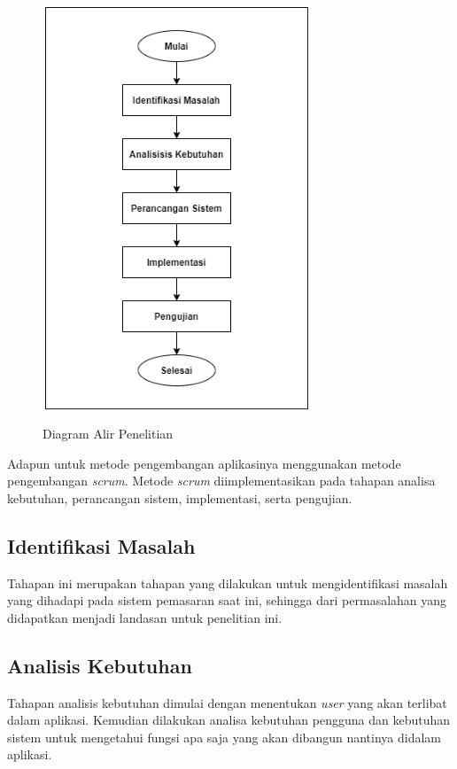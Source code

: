 \begin{figure}[H]
\centering
{\includegraphics [width = 8cm, height= 12cm]{gambar/flowchart_proposal}}
\caption{Diagram Alir Penelitian}
\label{alur_penelitian}
\end{figure}

\par Adapun untuk metode pengembangan aplikasinya menggunakan metode pengembangan \textit{scrum}. Metode \textit{scrum} diimplementasikan pada tahapan analisa kebutuhan, perancangan sistem, implementasi, serta pengujian.

\fancyhf{} 
\fancyfoot[R]{\thepage}

\subsection{Identifikasi Masalah}
Tahapan ini merupakan tahapan yang dilakukan untuk mengidentifikasi masalah yang dihadapi pada sistem pemasaran saat ini, sehingga dari permasalahan yang didapatkan menjadi landasan untuk penelitian ini.

\subsection{Analisis Kebutuhan}
Tahapan analisis kebutuhan dimulai dengan menentukan \textit{user} yang akan terlibat dalam aplikasi. Kemudian dilakukan analisa kebutuhan pengguna dan kebutuhan sistem untuk mengetahui fungsi apa saja yang akan dibangun nantinya didalam aplikasi.

